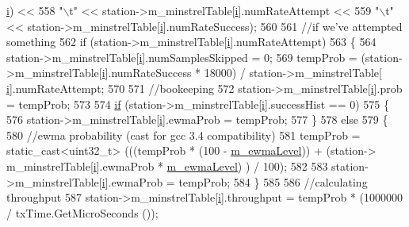\begin{DoxyCode}
      \hyperlink{bernuolliDistribution_8m_a6f6ccfcf58b31cb6412107d9d5281426}{i}) <<
558                     \textcolor{stringliteral}{"\(\backslash\)t"} << station->m\_minstrelTable[\hyperlink{bernuolliDistribution_8m_a6f6ccfcf58b31cb6412107d9d5281426}{i}].numRateAttempt <<
559                     \textcolor{stringliteral}{"\(\backslash\)t"} << station->m\_minstrelTable[\hyperlink{bernuolliDistribution_8m_a6f6ccfcf58b31cb6412107d9d5281426}{i}].numRateSuccess);
560 
561       \textcolor{comment}{//if we've attempted something}
562       \textcolor{keywordflow}{if} (station->m\_minstrelTable[\hyperlink{bernuolliDistribution_8m_a6f6ccfcf58b31cb6412107d9d5281426}{i}].numRateAttempt)
563         \{
564           station->m\_minstrelTable[\hyperlink{bernuolliDistribution_8m_a6f6ccfcf58b31cb6412107d9d5281426}{i}].numSamplesSkipped = 0;
569           tempProb = (station->m\_minstrelTable[\hyperlink{bernuolliDistribution_8m_a6f6ccfcf58b31cb6412107d9d5281426}{i}].numRateSuccess * 18000) / station->m\_minstrelTable[
      \hyperlink{bernuolliDistribution_8m_a6f6ccfcf58b31cb6412107d9d5281426}{i}].numRateAttempt;
570 
571           \textcolor{comment}{//bookeeping}
572           station->m\_minstrelTable[\hyperlink{bernuolliDistribution_8m_a6f6ccfcf58b31cb6412107d9d5281426}{i}].prob = tempProb;
573 
574           \hyperlink{loss__ITU1238_8m_a419d895abe1313c35fa353c93802647e}{if} (station->m\_minstrelTable[\hyperlink{bernuolliDistribution_8m_a6f6ccfcf58b31cb6412107d9d5281426}{i}].successHist == 0)
575             \{
576               station->m\_minstrelTable[\hyperlink{bernuolliDistribution_8m_a6f6ccfcf58b31cb6412107d9d5281426}{i}].ewmaProb = tempProb;
577             \}
578           \textcolor{keywordflow}{else}
579             \{
580               \textcolor{comment}{//ewma probability (cast for gcc 3.4 compatibility)}
581               tempProb = \textcolor{keyword}{static\_cast<}uint32\_t\textcolor{keyword}{>} (((tempProb * (100 - \hyperlink{classns3_1_1MinstrelWifiManager_a528f4990b2e92f3b38ee1a4f764f0166}{m\_ewmaLevel})) + (station->
      m\_minstrelTable[\hyperlink{bernuolliDistribution_8m_a6f6ccfcf58b31cb6412107d9d5281426}{i}].ewmaProb * \hyperlink{classns3_1_1MinstrelWifiManager_a528f4990b2e92f3b38ee1a4f764f0166}{m\_ewmaLevel}) ) / 100);
582 
583               station->m\_minstrelTable[\hyperlink{bernuolliDistribution_8m_a6f6ccfcf58b31cb6412107d9d5281426}{i}].ewmaProb = tempProb;
584             \}
585 
586           \textcolor{comment}{//calculating throughput}
587           station->m\_minstrelTable[\hyperlink{bernuolliDistribution_8m_a6f6ccfcf58b31cb6412107d9d5281426}{i}].throughput = tempProb * (1000000 / txTime.GetMicroSeconds ());

\end{DoxyCode}
